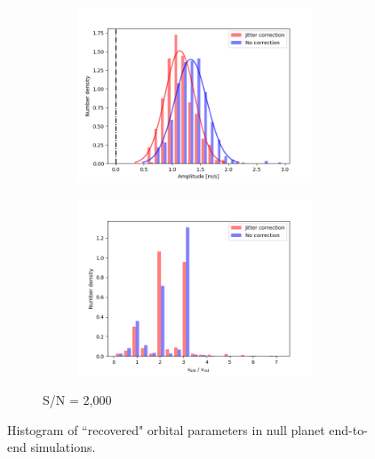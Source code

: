 \begin{figure}[tbp]
\begin{subfigure}[b]{1.0\textwidth}
    		\begin{subfigure}[b]{0.49\textwidth}
        		\includegraphics[width=\textwidth]{./Figures/Methods/Histogram_new1_null_2000.png}
		\end{subfigure}
		\begin{subfigure}[b]{0.49\textwidth}        		
        		\includegraphics[width=\textwidth]{./Figures/Methods/Histogram_new2_null_2000.png}
        	\end{subfigure}
        	\caption{S/N = 2,000}
    \end{subfigure}	       
    \caption[Histogram of recovered orbital parameters of null planets]
    {Histogram of ``recovered" orbital parameters in null planet end-to-end simulations.}
\label{fig:Histogram_null}
\end{figure}    

